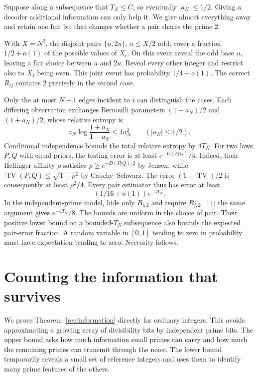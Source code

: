Suppose along a subsequence that $T_N\le C$, so eventually $|a_N|\le1/2$.
Giving a decoder additional information can only help it. We give almost
everything away and retain one fair bit that changes whether a pair
shares the prime 2.

With $X=N^2$, the disjoint pairs $\{u,2u\}$, $u\le X/2$ odd, cover
a fraction $1/2+o(1)$ of the possible values of $X_i$. On this event
reveal the odd base $u$, leaving a fair choice between $u$ and $2u$.
Reveal every other integer and restrict also to $X_j$ being even. This
joint event has probability $1/4+o(1)$. The correct $R_{ij}$ contains
2 precisely in the second case.

Only the at most $N-1$ edges incident to $i$ can distinguish the cases.
Each differing observation exchanges Bernoulli parameters
$(1-a_N)/2$ and $(1+a_N)/2$, whose relative entropy is
\[
 a_N\log\frac{1+a_N}{1-a_N}\le4a_N^2\qquad(|a_N|\le1/2).
\]
Conditional independence bounds the total relative entropy by $4T_N$.
For two laws $P,Q$ with equal priors, the testing error is at least
$e^{-D(P\Vert Q)}/4$. Indeed, their Hellinger affinity $\rho$ satisfies
$\rho\ge e^{-D(P\Vert Q)/2}$ by Jensen, while
$\operatorname{TV}(P,Q)\le\sqrt{1-\rho^2}$ by Cauchy--Schwarz.
The error $(1-\operatorname{TV})/2$ is consequently at least $\rho^2/4$.
Every pair estimator thus has error at least
\begin{equation}\label{rec:testing-lower}
 (1/16+o(1))e^{-4T_N}.
\end{equation}
In the independent-prime model, hide only $B_{i,2}$ and require $B_{j,2}=1$;
the same argument gives $e^{-4T_N}/8$.
The bounds are uniform in the choice of pair. Their positive lower bound
on a bounded-$T_N$ subsequence also bounds the expected pair-error
fraction. A random variable in $[0,1]$ tending to zero in probability
must have expectation tending to zero. Necessity follows.

\section{Counting the information that survives}\label{rec:information-proof}

We prove Theorem~\ref{rec:information} directly for ordinary integers.
This avoids approximating a growing array of divisibility bits by
independent prime bits. The upper bound asks how much information small
primes can carry and how much the remaining primes can transmit through
the noise. The lower bound temporarily reveals a small set of reference
integers and uses them to identify many prime features of the others.

